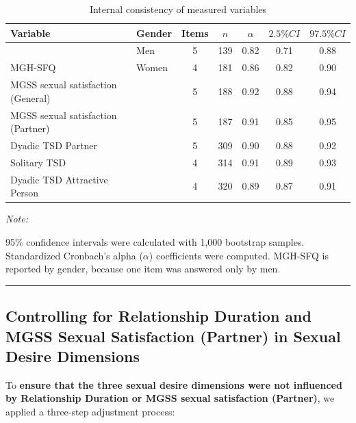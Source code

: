 \documentclass[
  bookmarksnumbered]{article}
\begin{document}
\begin{table}[H]
\centering
\caption{\label{tab:Cronbach-tab}Internal consistency of measured variables}
\centering
\begin{threeparttable}
\begin{tabular}[t]{llccccc}
\toprule
Variable & Gender & Items & $n$ & $\alpha$ & $2.5\% CI$ & $97.5\% CI$\\
\midrule
 & Men & 5 & 139 & 0.82 & 0.71 & 0.88\\
\cmidrule{2-7}
\multirow{-2}{*}{\raggedright\arraybackslash MGH-SFQ} & Women & 4 & 181 & 0.86 & 0.82 & 0.90\\
\cmidrule{1-7}
MGSS sexual satisfaction (General) &  & 5 & 188 & 0.92 & 0.88 & 0.94\\
\cmidrule{1-7}
MGSS sexual satisfaction (Partner) &  & 5 & 187 & 0.91 & 0.85 & 0.95\\
\cmidrule{1-7}
Dyadic TSD Partner &  & 5 & 309 & 0.90 & 0.88 & 0.92\\
\cmidrule{1-7}
Solitary TSD &  & 4 & 314 & 0.91 & 0.89 & 0.93\\
\cmidrule{1-7}
Dyadic TSD Attractive Person &  & 4 & 320 & 0.89 & 0.87 & 0.91\\
\bottomrule
\end{tabular}
\begin{tablenotes}[para]
\item \textit{Note: } 
\item 95\% confidence intervals were calculated with 1,000 bootstrap samples.
           Standardized Cronbach's alpha ($\alpha$) coefficients were computed.
           MGH-SFQ is reported by gender, because one item was answered only by men.
\end{tablenotes}
\end{threeparttable}
\end{table}

\begin{center}\rule{0.5\linewidth}{0.5pt}\end{center}

\subsection{Controlling for Relationship Duration and MGSS Sexual Satisfaction (Partner) in Sexual Desire Dimensions}\label{controlling-for-relationship-duration-and-mgss-sexual-satisfaction-partner-in-sexual-desire-dimensions}

To \textbf{ensure that the three sexual desire dimensions were not influenced by Relationship Duration or MGSS sexual satisfaction (Partner)}, we applied a three-step adjustment process:
\end{document}
